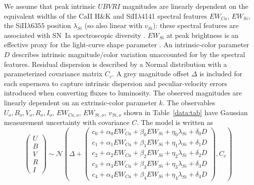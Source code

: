 \documentclass{aastex}   	%
\begin{document}
We assume 
that  peak intrinsic $UBVRI$ magnitudes are linearly dependent
on the equivalent widths of the CaII H\&K and SiII$\lambda$4141 spectral features
$EW_{Ca}$, $EW_{Si}$,
the SiII$\lambda6355$ position $\lambda_{Si}$ (so also linear with $v_{Si}$):
these spectral features are associated with SN~Ia  spectroscopic diversity  
\citep{2006PASP..118..560B,2009A&A...500L..17B, 2009PASP..121..238B, 2009ApJ...699L.139W, 2011ApJ...729...55F}.
$EW_{Si}$ at peak brightness is an effective proxy for the light-curve shape parameter
\citep{2011A&A...529L...4C}. 
An intrinsic-color parameter $D$ describes  intrinsic magnitude/color variation unaccounted for by the spectral features.
Residual dispersion is described by a Normal distribution with a parameterized covariance matrix
$C_c$.  A grey magnitude offset $\Delta$ is included for each supernova
to capture intrinsic dispersion and peculiar-velocity errors introduced when converting fluxes to luminosity.
The observed magnitudes are linearly dependent on an
extrinsic-color parameter $k$.  The observables
$U_o, B_o, V_o, R_o, I_o$, $EW_{Ca,o}$, $EW_{Si,o}$, $v_{Si,o}$
shown in Table~\ref{data:tab} have Gaussian measurement uncertainty with covariance $C$.
The model is written as
\begin{equation}
\begin{pmatrix}
U\\B\\V\\R\\I
\end{pmatrix}
\sim \mathcal{N}
\left(
\Delta +
\begin{pmatrix}
c_0+\alpha_0 EW_{Ca} + \beta_0 EW_{Si} + \eta_0 \lambda_{Si} + \delta_0 D\\
c_1+\alpha_1 EW_{Ca} + \beta_1 EW_{Si} + \eta_1 \lambda_{Si} + \delta_1 D \\
c_2+\alpha_2 EW_{Ca} + \beta_2 EW_{Si} + \eta_2 \lambda_{Si} + \delta_2 D\\
c_3+\alpha_3 EW_{Ca} + \beta_3 EW_{Si} + \eta_3 \lambda_{Si} + \delta_3 D\\
c_4+\alpha_4 EW_{Ca} + \beta_4 EW_{Si}+ \eta_4 \lambda_{Si} + \delta_4 D
\end{pmatrix}
,C_{c}
\right)
\label{ewsiv:eqn}
\end{equation}
\end{document}
